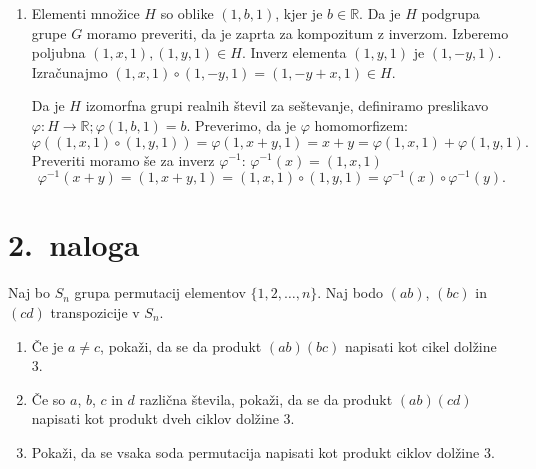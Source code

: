 \documentclass[a4,11pt]{article}
\newcommand{\R}{\mathbb{R}}
\begin{document}
\begin{enumerate}[label=(\alph*)]
    \item Elementi množice \(H\) so oblike \(\left(1, b, 1\right)\), kjer je \(b \in \R\).
    Da je \(H\) podgrupa grupe \(G\) moramo preveriti, da je zaprta za kompozitum z inverzom.
    Izberemo poljubna \(\left(1, x, 1\right), \left(1, y, 1\right) \in H\).
    Inverz elementa \(\left(1, y, 1\right)\) je \(\left(1, -y, 1\right)\).
    Izračunajmo \(\left(1, x, 1\right) \circ \left(1, -y, 1\right) = \left(1, -y + x, 1\right) \in H\).

    Da je \(H\) izomorfna grupi realnih števil za seštevanje, definiramo preslikavo
    \(\varphi: H \to \R; \varphi\left(1, b, 1\right) = b\).
    Preverimo, da je \(\varphi\) homomorfizem:
    \[
        \varphi\left(\left(1, x, 1\right) \circ \left(1, y, 1\right)\right)
        = \varphi\left(1, x + y, 1\right) = x + y 
        = \varphi\left(1, x, 1\right) + \varphi\left(1, y, 1\right).
    \]
    Preveriti moramo še za inverz \(\varphi^{-1}\): \(\varphi^{-1}\left(x\right) = \left(1, x, 1\right)\)
    \[
        \varphi^{-1}\left(x + y\right) = \left(1, x + y, 1\right) 
        = \left(1, x, 1\right) \circ \left(1, y, 1\right) 
        = \varphi^{-1}\left(x\right) \circ \varphi^{-1}\left(y\right).
    \]
\end{enumerate}

\section*{2.~naloga}
    Naj bo \(S_n\) grupa permutacij elementov \(\{1, 2, \ldots, n\}\).
    Naj bodo \(\left(ab\right)\), \(\left(bc\right)\) in \(\left(cd\right)\)
    transpozicije v \(S_n\).
    \begin{enumerate}[label=(\alph*)]
        \item Če je \(a \ne c\), pokaži, da se da produkt \(\left(ab\right)\left(bc\right)\)
        napisati kot cikel dolžine 3.
        \item  Če so \(a\), \(b\), \(c\) in \(d\) različna števila, pokaži, da se da produkt
        \(\left(ab\right)\left(cd\right)\) napisati kot produkt dveh ciklov dolžine 3.
        \item Pokaži, da se vsaka soda permutacija napisati kot produkt ciklov dolžine 3.
    \end{enumerate}
\end{document}
